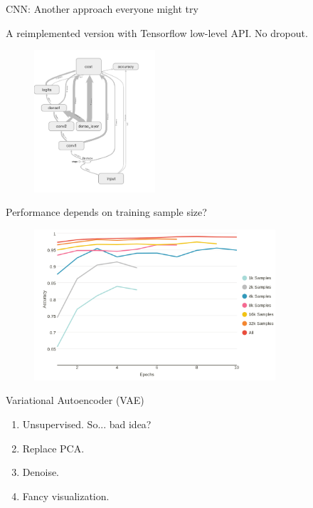 \documentclass[11pt]{beamer} %
\begin{document}
\begin{frame}[allowframebreaks]{CNN: Another approach everyone might try}

A reimplemented version with Tensorflow low-level API. No dropout.

\begin{figure}[htbp]
\centering
\includegraphics[width=0.4\textwidth]{img/cnn1.png}
\end{figure}    

\framebreak


\begin{table}[htbp]
\centering
{}
\end{table}

\framebreak

Performance depends on training sample size?

\begin{figure}[htbp]
\centering
\includegraphics[width=0.8\textwidth]{img/cnn_sample_size.png}
\end{figure}
\end{frame}

\begin{frame}{Variational Autoencoder (VAE)}
\begin{enumerate}
    \item Unsupervised. So... bad idea?
    \item Replace PCA.
    \item Denoise.
    \item Fancy visualization.
\end{enumerate}
\end{frame}
\end{document}
